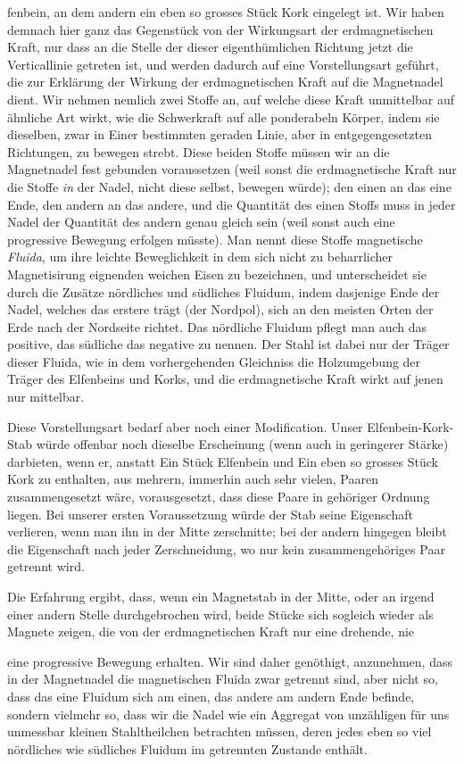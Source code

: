 \noindent fenbein, an dem andern ein eben so grosses Stück Kork eingelegt ist. Wir haben demnach hier ganz das Gegenstück von der Wirkungsart der erdmagnetischen Kraft, nur dass an die Stelle der dieser eigenthümlichen Richtung jetzt die Verticallinie getreten ist, und werden dadurch auf eine Vorstellungsart geführt, die zur Erklärung der Wirkung der erdmagnetischen Kraft auf die Magnetnadel dient. Wir nehmen nemlich zwei Stoffe an, auf welche diese Kraft unmittelbar auf ähnliche Art wirkt, wie die Schwerkraft auf alle ponderabeln Körper, indem sie dieselben, zwar in Einer bestimmten geraden Linie, aber in entgegengesetzten Richtungen, zu bewegen strebt. Diese beiden Stoffe müssen wir an die Magnetnadel fest gebunden voraussetzen (weil sonst die erdmagnetische Kraft nur die Stoffe \textit{in} der Nadel, nicht diese selbst, bewegen würde); den einen an das eine Ende, den andern an das andere, und die Quantität des einen Stoffs muss in jeder Nadel der Quantität des andern genau gleich sein (weil sonst auch eine progressive Bewegung erfolgen müsste). Man nennt diese Stoffe magnetische \textit{Fluida}, um ihre leichte Beweglichkeit in dem sich nicht zu beharrlicher Magnetisirung eignenden weichen Eisen zu bezeichnen, und unterscheidet sie durch die Zusätze nördliches und südliches Fluidum, indem dasjenige Ende der Nadel, welches das erstere trägt (der Nordpol), sich an den meisten Orten der Erde nach der Nordseite richtet. Das nördliche Fluidum pflegt man auch das positive, das südliche das negative zu nennen. Der Stahl ist dabei nur der Träger dieser Fluida, wie in dem vorhergehenden Gleichniss die Holzumgebung der Träger des Elfenbeins und Korks, und die erdmagnetische Kraft wirkt auf jenen nur mittelbar.

Diese Vorstellungsart bedarf aber noch einer Modification. Unser Elfenbein-Kork-Stab würde offenbar noch dieselbe Erscheinung (wenn auch in geringerer Stärke) darbieten, wenn er, anstatt Ein Stück Elfenbein und Ein eben so grosses Stück Kork zu enthalten, aus mehrern, immerhin auch sehr vielen, Paaren zusammengesetzt wäre, vorausgesetzt, dass diese Paare in gehöriger Ordnung liegen. Bei unserer ersten Voraussetzung würde der Stab seine Eigenschaft verlieren, wenn man ihn in der Mitte zerschnitte; bei der andern hingegen bleibt die Eigenschaft nach jeder Zerschneidung, wo nur kein zusammengehöriges Paar getrennt wird.

Die Erfahrung ergibt, dass, wenn ein Magnetstab in der Mitte, oder an irgend einer andern Stelle durchgebrochen wird, beide Stücke sich sogleich wieder als Magnete zeigen, die von der erdmagnetischen Kraft nur eine drehende, nie
\par\clearpage
{}
\noindent eine progressive Bewegung erhalten. Wir sind daher genöthigt, anzunehmen, dass in der Magnetnadel die magnetischen Fluida zwar getrennt sind, aber nicht so, dass das eine Fluidum sich am einen, das andere am andern Ende befinde, sondern vielmehr so, dass wir die Nadel wie ein Aggregat von unzähligen für uns unmessbar kleinen Stahltheilchen betrachten müssen, deren jedes eben so viel nördliches wie südliches Fluidum im getrennten Zustande enthält.


